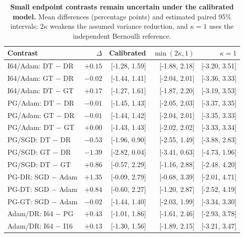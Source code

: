 \begin{table}[t]
\centering\small
\setlength{\tabcolsep}{4pt}
\caption{\textbf{Small endpoint contrasts remain uncertain under the calibrated model.} Mean differences (percentage points) and estimated paired 95\% intervals; $2\kappa$ weakens the assumed variance reduction, and $\kappa=1$ uses the independent Bernoulli reference.}
\label{tab:paired_contrasts}
\begin{tabular}{lrrrr}
\toprule
Contrast & $\Delta$ & Calibrated & $\min(2\kappa,1)$ & $\kappa=1$ \\
\midrule
I64/Adam: DT $-$ DR & $+0.15$ & [-1.28, 1.59] & [-1.88, 2.18] & [-3.20, 3.51] \\
I64/Adam: GT $-$ DR & $-0.02$ & [-1.44, 1.41] & [-2.04, 2.01] & [-3.36, 3.33] \\
I64/Adam: DT $-$ GT & $+0.17$ & [-1.27, 1.61] & [-1.87, 2.20] & [-3.19, 3.53] \\
PG/Adam: DT $-$ DR & $-0.01$ & [-1.45, 1.43] & [-2.05, 2.03] & [-3.37, 3.35] \\
PG/Adam: GT $-$ DR & $-0.01$ & [-1.44, 1.42] & [-2.04, 2.01] & [-3.35, 3.33] \\
PG/Adam: DT $-$ GT & $+0.00$ & [-1.43, 1.43] & [-2.02, 2.02] & [-3.33, 3.34] \\
PG/SGD: DT $-$ DR & $-0.53$ & [-1.96, 0.90] & [-2.55, 1.49] & [-3.88, 2.83] \\
PG/SGD: GT $-$ DR & $-1.39$ & [-2.82, 0.04] & [-3.41, 0.63] & [-4.73, 1.96] \\
PG/SGD: DT $-$ GT & $+0.86$ & [-0.57, 2.29] & [-1.16, 2.88] & [-2.48, 4.20] \\
PG-DR: SGD $-$ Adam & $+1.35$ & [-0.09, 2.79] & [-0.68, 3.39] & [-2.01, 4.71] \\
PG-DT: SGD $-$ Adam & $+0.84$ & [-0.60, 2.27] & [-1.20, 2.87] & [-2.52, 4.19] \\
PG-GT: SGD $-$ Adam & $-0.02$ & [-1.44, 1.40] & [-2.03, 1.99] & [-3.34, 3.30] \\
Adam/DR: I64 $-$ PG & $+0.43$ & [-1.01, 1.86] & [-1.61, 2.46] & [-2.93, 3.78] \\
Adam/DR: I64 $-$ I16 & $+0.13$ & [-1.30, 1.56] & [-1.89, 2.15] & [-3.21, 3.47] \\
\bottomrule
\end{tabular}
\end{table}
